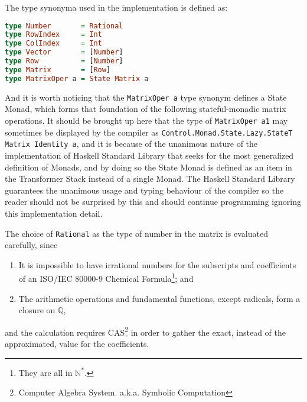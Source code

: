\documentclass[12pt,a4paper]{article}
\begin{document}
The type synonyma used in the implementation is defined as:
\begin{lstlisting}[language=Haskell]
type Number       = Rational
type RowIndex     = Int
type ColIndex     = Int
type Vector       = [Number]
type Row          = [Number]
type Matrix       = [Row]
type MatrixOper a = State Matrix a
\end{lstlisting}
And it is worth noticing that the \texttt{MatrixOper a} type synonym defines a State Monad, which forms that foundation of the following stateful-monadic matrix operations. It should be brought up here that the type of \texttt{MatrixOper a1} may sometimes be displayed by the compiler as \texttt{Control.Monad.State.Lazy.StateT Matrix Identity a}, and it is because of the unanimous nature of the implementation of Haskell Standard Library that seeks for the most generalized definition of Monads, and by doing so the State Monad is defined as an item in the Transformer Stack instead of a single Monad. The Haskell Standard Library guarantees the unanimous usage and typing behaviour of the compiler so the reader should not be surprised by this and should continue programming ignoring this implementation detail.

The choice of \texttt{Rational} as the type of number in the matrix is evaluated carefully, since
\begin{enumerate}
\item
It is impossible to have irrational numbers for the subscripts and coefficients of an ISO/IEC 80000-9 Chemical Formula\footnote{They are all in $\mathbb{N}^*$.}; and
\item
The arithmetic operations and fundamental functions, except radicals, form a closure on $\mathbb{Q}$,
\end{enumerate}
and the calculation requires CAS\footnote{Computer Algebra System. a.k.a. Symbolic Computation} in order to gather the exact, instead of the approximated, value for the coefficients.
\end{document}
